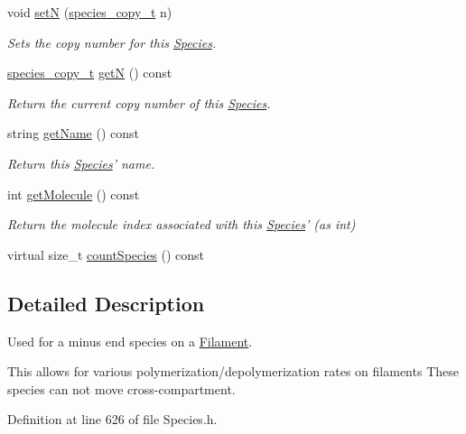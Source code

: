 \begin{DoxyCompactItemize}
void \hyperlink{classSpecies_a88de7cf5130cb9cee2da3585374db654}{set\+N} (\hyperlink{common_8h_a3503f321fd36304ee274141275cca586}{species\+\_\+copy\+\_\+t} n)
\begin{DoxyCompactList}\small\item\em Sets the copy number for this \hyperlink{classSpecies}{Species}. \end{DoxyCompactList}\item 
\hyperlink{common_8h_a3503f321fd36304ee274141275cca586}{species\+\_\+copy\+\_\+t} \hyperlink{classSpecies_aea7327b3fed261c705b4d32b9973aa58}{get\+N} () const 
\begin{DoxyCompactList}\small\item\em Return the current copy number of this \hyperlink{classSpecies}{Species}. \end{DoxyCompactList}\item 
string \hyperlink{classSpecies_a28fa239dded841133760ff9c47af63a1}{get\+Name} () const 
\begin{DoxyCompactList}\small\item\em Return this \hyperlink{classSpecies}{Species}' name. \end{DoxyCompactList}\item 
int \hyperlink{classSpecies_a1ea8969c51bc69879891a408f9e197c7}{get\+Molecule} () const 
\begin{DoxyCompactList}\small\item\em Return the molecule index associated with this \hyperlink{classSpecies}{Species}' (as int) \end{DoxyCompactList}\item 
virtual size\+\_\+t \hyperlink{classSpecies_a1864e111fe0304ca8d6b2d0d955a7356}{count\+Species} () const 
\end{DoxyCompactItemize}


\subsection{Detailed Description}
Used for a minus end species on a \hyperlink{classFilament}{Filament}. 

This allows for various polymerization/depolymerization rates on filaments These species can not move cross-\/compartment. 

Definition at line 626 of file Species.\+h.



